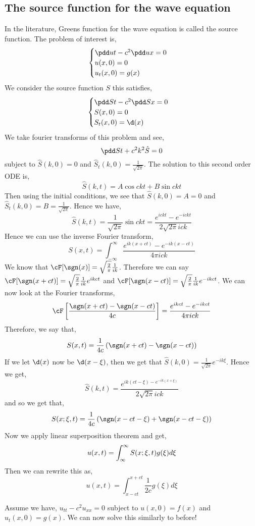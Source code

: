 \subsection{The source function for the wave equation}
In the literature, Greens function for the wave equation is called the source function. The problem of interest is,
$$ \begin{cases}
  \pdd u t - c^2 \pdd u x = 0 \\
  u(x, 0) = 0 \\
  u_t(x, 0) = g(x)
\end{cases} $$
We consider the source function $S$ this satisfies,
$$ \begin{cases}
  \pdd S t - c^2 \pdd S x = 0 \\
  S(x, 0) = 0 \\
  S_t(x, 0) = \d(x)
\end{cases} $$
We take fourier transforms of this problem and see,
$$ \pdd S t + c^2k^2 \hat S = 0 $$
subject to $\hat S (k, 0) = 0$ and $\hat S_t (k, 0) = \frac{1}{\sqrt{2\pi}}$. The solution to this second order ODE is,
$$ \hat S(k, t) = A\cos ckt + B\sin ckt $$
Then using the initial conditions, we see that $\hat S(k, 0) = A = 0$ and $\hat S_t (k, 0) = B = \frac{1}{\sqrt{2\pi}}$. Hence we have,
$$ \hat S(k, t) = \frac{1}{\sqrt{2\pi}}\sin ckt = \frac{e^{ickt} - e^{-ickt}}{2\sqrt{2\pi}ick} $$
Hence we can use the inverse Fourier transform,
$$ S(x, t) = \int_{-\infty}^\infty \frac{e^{ik(x + ct)} - e^{-ik(x - ct)}}{4\pi ick} $$
We know that $\cF[\sgn (x)] = \sqrt{\frac{2}{\pi}}\frac{1}{ik}$. Therefore we can say $\cF [ \sgn (x + ct)] = \sqrt{\frac{2}{\pi}}\frac{1}{ik}e^{ikct}$ and $\cF [ \sgn (x - ct)] = \sqrt{\frac{2}{\pi}}\frac{1}{ik}e^{-ikct}$.
We can now look at the Fourier transforms,
$$ \cF \left[ \frac{\sgn(x + ct) - \sgn(x - ct)}{4c} \right] = \frac{e^{ikct} - e^{-ikct}}{4\pi ick} $$
Therefore, we say that,
$$ S(x, t) = \frac{1}{4c}\left( \sgn(x + ct) - \sgn(x - ct)\right) $$
If we let $\d(x)$ now be $\d(x - \xi)$, then we get that $\hat S(k, 0) = \frac{1}{\sqrt{2\pi}}e^{-ik\xi}$. Hence we get,
$$ \hat S(k, t) = \frac{e^{ik(ct - \xi) - e^{-ik(x + \xi)}}}{2\sqrt {2 \pi}ick} $$
and so we get that,
$$ S(x; \xi, t) = \frac{1}{4c}\left( \sgn(x - ct - \xi) + \sgn(x - ct - \xi) \right) $$
Now we apply linear superposition theorem and get,
$$ u(x, t) = \int_{\-\infty}^\infty S(x; \xi, t) g(\xi)d\xi $$
Then we can rewrite this as,
$$ u(x, t) = \int_{x - ct}^{x + ct} \frac{1}{2c}g(\xi)d\xi $$

\noindent
Assume we have, $u_{tt} - c^2u_{xx} = 0$ subject to $u(x, 0) = f(x)$ and $u_t(x, 0) = g(x)$. We can now solve this similarly to before!